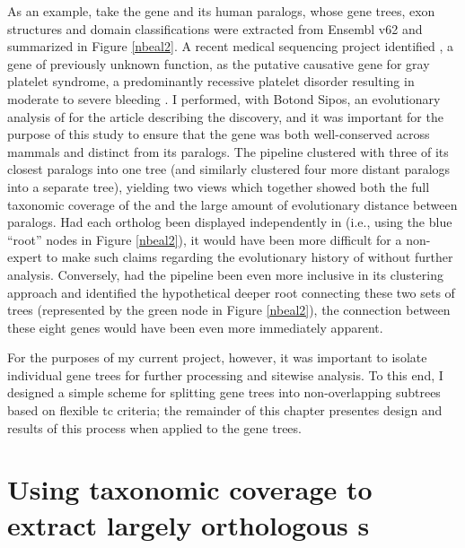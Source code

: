 As an example, take the gene  and its human paralogs,
whose gene trees, exon structures and domain classifications were
extracted from Ensembl v62 and summarized in Figure \ref{nbeal2}. A
recent medical sequencing project identified , a gene of
previously unknown function, as the putative causative gene for gray
platelet syndrome, a predominantly recessive platelet disorder
resulting in moderate to severe bleeding \citep{Albers2011}. I
performed, with Botond Sipos, an evolutionary analysis of
 for the article describing the discovery, and it was
important for the purpose of this study to ensure that the
 gene was both well-conserved across mammals and distinct
from its paralogs. The \cmp pipeline clustered  with
three of its closest paralogs into one tree (and similarly clustered
four more distant  paralogs into a separate tree),
yielding two views which together showed both the full taxonomic
coverage of the  \subtr{} and the large amount of
evolutionary distance between paralogs. Had each \mammln ortholog been
displayed independently in \ens (i.e., using the blue ``\euth root''
nodes in Figure \ref{nbeal2}), it would have been more difficult for a
non-expert to make such claims regarding the evolutionary history of
 without further analysis. Conversely, had the \cmp
pipeline been even more inclusive in its clustering approach and
identified the hypothetical deeper root connecting these two sets of
trees (represented by the green node in Figure \ref{nbeal2}), the
connection between these eight genes would have been even more
immediately apparent.

For the purposes of my current project, however, it was important to
isolate individual \mammln gene trees for further processing and
sitewise analysis. To this end, I designed a simple scheme for
splitting gene trees into non-overlapping subtrees based on flexible
\ac{tc} criteria; the remainder of this chapter presentes
design and results of this process when applied to the \cmp gene
trees.

\section{Using taxonomic coverage to extract largely orthologous \subtr{}s}

